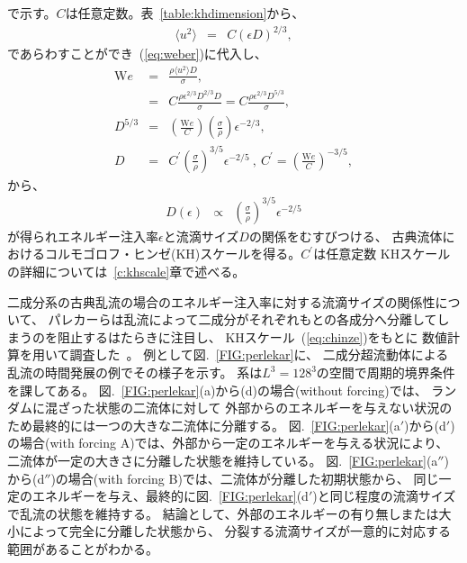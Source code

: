 \documentclass[12pt,a4paper]{jbook}
\def\Vec#1{\mbox{\boldmath $#1$}}			%
\begin{document}
        で示す。$C$は任意定数。表~\ref{table:khdimension}から、
        \begin{eqnarray}
            \langle u^2 \rangle
            & = & 
            C (\epsilon D)^{2/3},
        \end{eqnarray}
        であらわすことができ~(\ref{eq:weber})に代入し、
        \begin{eqnarray}
            {\mathrm We} & = & \frac{\rho \langle u^2 \rangle D}{\sigma},
            \\
            & = & C \frac{\rho \epsilon^{2/3} D^{2/3} D}{\sigma}
            = C \frac{\rho \epsilon^{2/3} D^{5/3}}{\sigma},
            \\
            D^{5/3} & = & \left( \frac{{\mathrm We}}{C}\right) \left( \frac{\sigma}{\rho} \right) \epsilon^{-2/3},
            \\
            D & = & C^\prime \left( \frac{\sigma}{\rho} \right)^{3/5} \epsilon^{-2/5}
            \ , \ C^\prime = \left( \frac{{\mathrm We}}{C} \right)^{-3/5},
        \end{eqnarray}
        から、
        \begin{eqnarray}
            \label{eq:chinze}
            D(\epsilon) & \propto & \left( \frac{\sigma}{\rho} \right)^{3/5} \epsilon^{-2/5}
        \end{eqnarray}
        が得られエネルギー注入率$\epsilon$と流滴サイズ$D$の関係をむすびつける、
        古典流体におけるコルモゴロフ・ヒンゼ(KH)スケールを得る。$C^\prime$は任意定数
        KHスケールの詳細については~\ref{c:khscale}章で述べる。


        二成分系の古典乱流の場合のエネルギー注入率に対する流滴サイズの関係性について、
        パレカーらは乱流によって二成分がそれぞれもとの各成分へ分離してしまうのを阻止するはたらきに注目し、
        KHスケール~(\ref{eq:chinze})をもとに
        数値計算を用いて調査した~\cite{Perlekar12, Perlekar14}。
        例として図.~\ref{FIG:perlekar}に、
        二成分超流動体による乱流の時間発展の例でその様子を示す。
        系は$L^3=128^3$の空間で周期的境界条件を課してある。
        図.~\ref{FIG:perlekar}(a)から(d)の場合(without forcing)では、
        ランダムに混ざった状態の二流体に対して
        外部からのエネルギーを与えない状況のため最終的には一つの大きな二流体に分離する。
        図.~\ref{FIG:perlekar}(a$'$)から(d$'$)の場合(with forcing A)では、外部から一定のエネルギーを与える状況により、
        二流体が一定の大きさに分離した状態を維持している。
        図.~\ref{FIG:perlekar}(a$''$)から(d$''$)の場合(with forcing B)では、二流体が分離した初期状態から、
        同じ一定のエネルギーを与え、最終的に図.~\ref{FIG:perlekar}(d$'$)と同じ程度の流滴サイズで乱流の状態を維持する。
        結論として、外部のエネルギーの有り無しまたは大小によって完全に分離した状態から、
        分裂する流滴サイズが一意的に対応する範囲があることがわかる。
\end{document}
